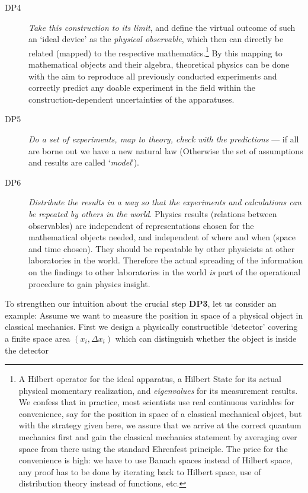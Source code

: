 \begin{description}
\item[DP4] {\emph{Take this construction to its limit}}, and define the virtual outcome of
  such an `ideal device' as the {\emph{physical observable}}, which then can directly be
  related (mapped) to the respective mathematics.\footnote{A Hilbert operator for the
    ideal apparatus, a Hilbert State for its actual physical momentary realization, and
    {\emph{eigenvalues}} for its measurement results. We confess that in practice, most
    scientists use real continuous variables for convenience, say for the position in
    space of a classical mechanical object, but with the strategy given here, we assure
    that we arrive at the correct quantum mechanics first and gain the classical mechanics
    statement by averaging over space from there using the standard Ehrenfest principle.
    The price for the convenience is high: we have to use Banach spaces instead of Hilbert
    space, any proof has to be done by iterating back to Hilbert space, use of
    distribution theory instead of functions, etc.} By this mapping to mathematical
  objects and their algebra, theoretical physics can be done with the aim to reproduce all
  previously conducted experiments and correctly predict any doable experiment in the field within the
  construction-dependent uncertainties of the apparatuses.
\item[DP5] {\emph{Do a set of experiments, map to theory, check with the predictions}} ---
  if all are borne out we have a new natural law (Otherwise the set of assumptions and
  results are called `{\emph{model}}').
\item[DP6] {\emph{Distribute the results in a way so that the experiments and calculations
      can be repeated by others in the world}}. Physics results (relations between
  observables) are independent of representations chosen for the mathematical objects
  needed, and independent of where and when (space and time chosen).  They should be
  repeatable by other physicists at other laboratories in the world. Therefore the actual
  spreading of the information on the findings to other laboratories in the world
  {\emph{is}} part of the operational procedure to gain physics insight.
\end{description}
To strengthen our intuition about the crucial step {\bf{DP3}}, let us consider an example:
Assume we want to measure the position in space of a physical object in classical
mechanics.  First we design a physically constructible `detector' covering a finite space
area $(x_i,\Delta x_i)$ which can distinguish whether the object is inside the detector
